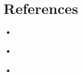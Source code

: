 \chapter{References}

\begin{itemize}
    \item \emph{\href{https://web.cs.dal.ca/~hawkey/3130/srs_template-ieee.doc}{\color{cyan}{IEEE Software Requirements Speification Template.}}}
    \item \emph{\href{https://atlante.energy}{\color{cyan}{Atlante.}}}
    \item \emph{\href{https://mobilityintegrationsymposium.org/wp-content/uploads/sites/10/2018/11/4A_3_Emob18_024_paper_Filipe_Campos.pdf}{\color{cyan}{Electric Vehicle CPMS and Secondary Substation Management.}}}
\end{itemize}